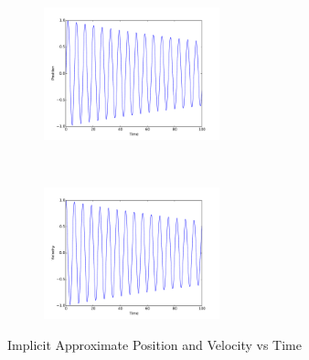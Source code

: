 \documentclass{article}
\begin{document}
\begin{enumerate}
	\begin{figure}[ht!]
		\centering
		\begin{subfigure}{0.4\linewidth}
		\centering
		\includegraphics[width=2in]{p_i.pdf}
		\caption{}
		\end{subfigure}
		~
		\begin{subfigure}{0.4\linewidth}
		\centering
		\includegraphics[width=2in]{v_i.pdf}
		\caption{}
		\end{subfigure}
		
		\caption{Implicit Approximate Position and Velocity vs Time}
		\label{fig:implicit}	
	\end{figure}
	

\end{enumerate}
\end{document}
